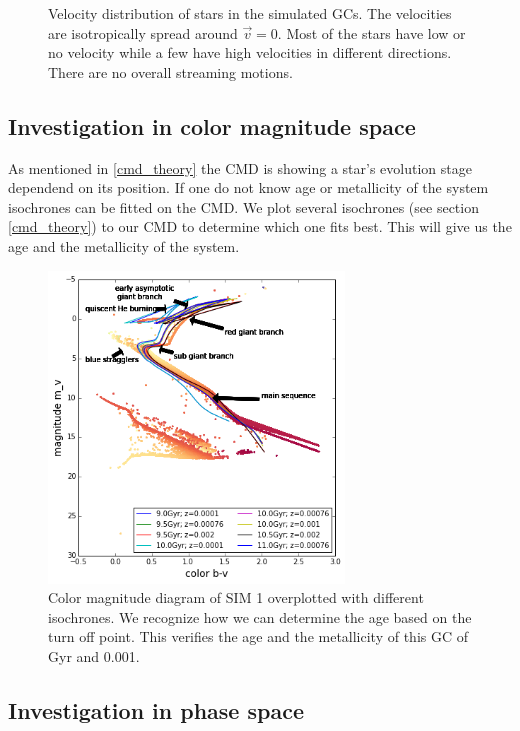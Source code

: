 \begin{figure}[htbp]
\caption{Velocity distribution of stars in the simulated \acp{GC}. The velocities are isotropically spread around \(\vec{v}=0\). Most of the stars have low or no velocity while a few have high velocities in different directions. There are no overall streaming motions.}
\label{fig:velocity_scatter}
\end{figure}


\subsection{Investigation in color magnitude space}
As mentioned in \ref{cmd_theory} the \ac{CMD} is showing a star's evolution stage dependend on its position. If one do not know age or metallicity of the system isochrones can be fitted on the \ac{CMD}. We plot several isochrones (see section \ref{cmd_theory}) to our \ac{CMD} to determine which one fits best. This will give us the age and the metallicity of the system. 
\begin{figure}[htbp]
\centering
\includegraphics[width=0.7\textwidth]{Plots/cmd_isochrones}
\caption{Color magnitude diagram of SIM 1 overplotted with different isochrones. We recognize how we can determine the age based on the turn off point. This verifies the age and the metallicity of this \ac{GC} of \unit[10]{Gyr} and 0.001.}
	\label{fig:cmd_isochrones}
\end{figure}



\subsection{Investigation in phase space}

